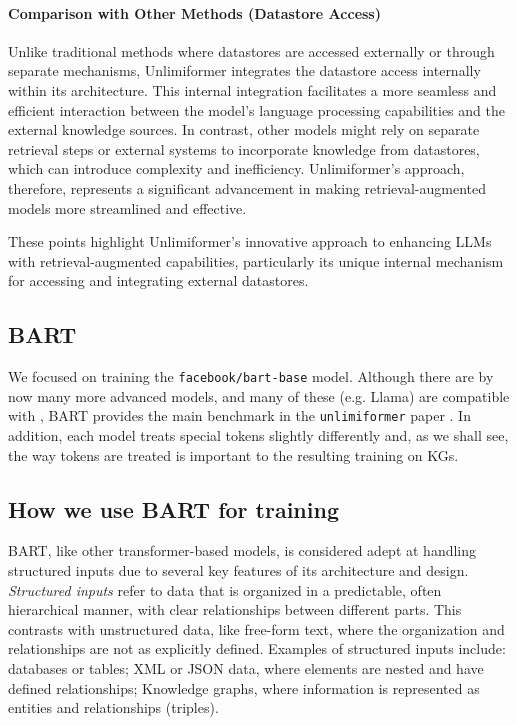 \documentclass[12pt]{article}
\begin{document}
\paragraph{Comparison with Other Methods (Datastore Access)} Unlike traditional
methods where datastores are accessed externally or through separate
mechanisms, Unlimiformer integrates the datastore access internally within its
architecture. This internal integration facilitates a more seamless and
efficient interaction between the model's language processing capabilities and
the external knowledge sources. In contrast, other models might rely on
separate retrieval steps or external systems to incorporate knowledge from
datastores, which can introduce complexity and inefficiency. Unlimiformer's
approach, therefore, represents a significant advancement in making
retrieval-augmented models more streamlined and effective.

These points highlight Unlimiformer's innovative approach to enhancing LLMs with retrieval-augmented capabilities, particularly its unique internal mechanism for accessing and integrating external datastores.

\subsection*{BART} We focused on training the \texttt{facebook/bart-base}
model. Although there are by now many more advanced models, and many of these
(e.g. Llama) are compatible with , BART provides the main
benchmark in the \texttt{unlimiformer} paper \cite{bertsch2023unlimiformer}.
In addition, each model treats special tokens slightly differently and, as we
shall see, the way tokens are treated is important to the resulting training on
KGs.

\subsection{How we use BART for training}
BART, like other transformer-based models, is considered adept at handling
structured inputs due to several key features of its architecture and design.
\emph{Structured inputs} refer to data that is organized in a predictable,
often hierarchical manner, with clear relationships between different parts.
This contrasts with unstructured data, like free-form text, where the
organization and relationships are not as explicitly defined. Examples of
structured inputs include: databases or tables; XML or JSON data, where
elements are nested and have defined relationships; Knowledge graphs, where
information is represented as entities and relationships (triples).
\end{document}
